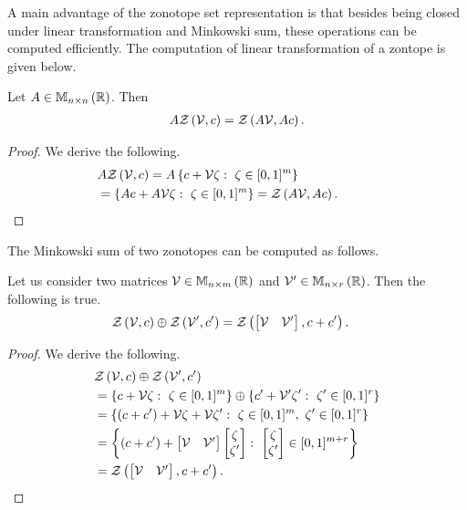 A main advantage of the zonotope set representation is that besides
being closed under linear transformation and Minkowski sum, these
operations can be computed efficiently.  The computation of linear
transformation of a zontope is given below.
%
\begin{lemma}
Let $A\in\mathbb{M}_{n\times n}\left(\mathbb{R}\right)$.  Then
%
\begin{align*}
A\mathit{\mathcal{Z}}\left(\mathcal{V},c\right)=\mathit{\mathcal{Z}}\left(A\mathcal{V},Ac\right).
\end{align*}
%
\end{lemma} 
%
\begin{proof}
We derive the following.
%
\begin{align*}
&
  A\mathit{\mathcal{Z}}\left(\mathcal{V},c\right)=A\left\{c+\mathcal{V}\zeta:~\zeta\in[0,1]^m\right\}\\
& = \left\{Ac+A\mathcal{V}\zeta:~\zeta\in[0,1]^m\right\}=\mathit{\mathcal{Z}}\left(A\mathcal{V},Ac\right).\hspace{3em}\qedhere
\end{align*}
%
\end{proof}
%
The Minkowski sum of two zonotopes can be computed as follows.
%
\begin{lemma}
Let us consider two matrices $\mathcal{V}\in\mathbb{M}_{n\times m}\left(\mathbb{R}\right)$ and
$\mathcal{V}^\prime\in\mathbb{M}_{n\times r}\left(\mathbb{R}\right)$.  Then the following is true.
%
\begin{align*}
& \mathit{\mathcal{Z}}\left(\mathcal{V},c\right)\oplus\mathit{\mathcal{Z}}\left(\mathcal{V}^\prime,c^\prime\right)
= \mathit{\mathcal{Z}}\left(\left[\begin{matrix}\mathcal{V} & \mathcal{V}^\prime\end{matrix}\right],c+c^\prime\right).  
\end{align*}
%
\end{lemma}
%
\begin{proof}
We derive the following.
%
\begin{align*}
& \mathit{\mathcal{Z}}\left(\mathcal{V},c\right)\oplus\mathit{\mathcal{Z}}\left(\mathcal{V}^\prime,c^\prime\right)\\
& = \left\{c+\mathcal{V}\zeta:~\zeta\in[0,1]^m\right\}\oplus\left\{c^\prime+\mathcal{V}^\prime\zeta^\prime:~\zeta^\prime\in[0,1]^r\right\}\\
& =
  \left\{\left(c+c^\prime\right)+\mathcal{V}\zeta+\mathcal{V}\zeta^\prime:~\zeta\in[0,1]^m,~\zeta^\prime\in[0,1]^r\right\}\\
& = \left\{\left(c+c^\prime\right)+\left[\begin{matrix}\mathcal{V}
      &\mathcal{V}^\prime\end{matrix}\right]\left[\begin{matrix}\zeta\\\zeta^\prime\end{matrix}\right]:~{\left[\begin{matrix}\zeta\\\zeta^\prime\end{matrix}\right]}\in[0,1]^{m+r}\right\}\\
& =  \mathit{\mathcal{Z}}\left(\left[\begin{matrix}\mathcal{V} & \mathcal{V}^\prime\end{matrix}\right],c+c^\prime\right).\hspace{3em}\qedhere
\end{align*}
%
\end{proof}
